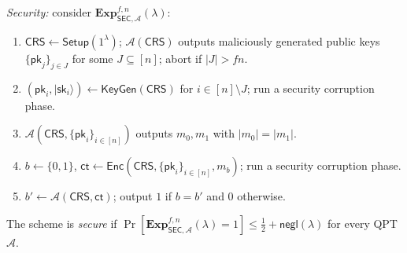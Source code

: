 \documentclass{aicr-conjecture}
\newcommand{\ket}[1]{\lvert #1 \rangle}
\newcommand{\negl}{\mathsf{negl}}
\newcommand{\Setup}{\mathsf{Setup}}
\newcommand{\KeyGen}{\mathsf{KeyGen}}
\newcommand{\Enc}{\mathsf{Enc}}
\newcommand{\CRS}{\mathsf{CRS}}
\newcommand{\pk}{\mathsf{pk}}
\newcommand{\sk}{\mathsf{sk}}
\newcommand{\ct}{\mathsf{ct}}
\begin{document}
\begin{definition}
\emph{Security:} consider $\mathbf{Exp}^{f,n}_{\mathsf{SEC},
\mathcal{A}}(\lambda)$:
\begin{enumerate}[leftmargin=1.6em]
  \item $\CRS \gets \Setup(1^{\lambda})$; $\mathcal{A}(\CRS)$ outputs
    maliciously generated public keys $\{\pk_{j}\}_{j \in J}$ for some
    $J \subseteq [n]$; abort if $\lvert J \rvert > f n$.
  \item $(\pk_{i}, \ket{\sk_{i}}) \gets \KeyGen(\CRS)$ for $i \in [n]
    \setminus J$; run a security corruption phase.
  \item $\mathcal{A}(\CRS, \{\pk_{i}\}_{i \in [n]})$ outputs $m_{0},
    m_{1}$ with $\lvert m_{0} \rvert = \lvert m_{1} \rvert$.
  \item $b \gets \{0,1\}$, $\ct \gets \Enc(\CRS, \{\pk_{i}\}_{i \in
    [n]}, m_{b})$; run a security corruption phase.
  \item $b' \gets \mathcal{A}(\CRS, \ct)$; output $1$ if $b = b'$ and
    $0$ otherwise.
\end{enumerate}
The scheme is \emph{secure} if
$\Pr[\mathbf{Exp}^{f,n}_{\mathsf{SEC}, \mathcal{A}}(\lambda) = 1] \le
\tfrac{1}{2} + \negl(\lambda)$ for every QPT $\mathcal{A}$.


\end{definition}
\end{document}
